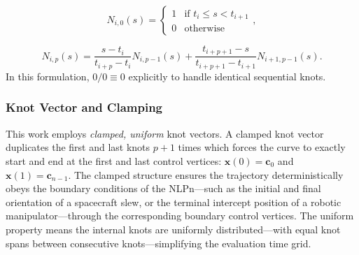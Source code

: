 \begin{equation}
    N_{i,0}(s) =
    \begin{cases}
    1 & \text{if } t_i \le s < t_{i+1} \\
    0 & \text{otherwise}
    \end{cases},
    \label{eq:cox_de_boor_0}
\end{equation}

\begin{equation}
    N_{i,p}(s) =
    \frac{s - t_i}{t_{i+p} - t_i} N_{i,p-1}(s) +\frac{t_{i+p+1} - s}{t_{i+p+1} - t_{i+1}} N_{i+1,p-1}(s).
    \label{eq:cox_de_boor_p}
\end{equation}
In this formulation, $0/0 \equiv 0$ explicitly to handle identical sequential knots.

\subsubsection{Knot Vector and Clamping}
This work employs \emph{clamped, uniform} knot vectors. 
A clamped knot vector duplicates the first and last knots $p+1$ times which forces the curve to exactly start and end at the first and last control vertices: $\mathbf{x}(0) = \mathbf{c}_0$ and $\mathbf{x}(1) = \mathbf{c}_{n-1}$. 
The clamped structure ensures the trajectory deterministically obeys the boundary conditions of the \ac{NLPn}---such as the initial and final orientation of a spacecraft slew, or the terminal intercept position of a robotic manipulator---through the corresponding boundary control vertices.
The uniform property means the internal knots are uniformly distributed---with equal knot spans between consecutive knots---simplifying the evaluation time grid.

